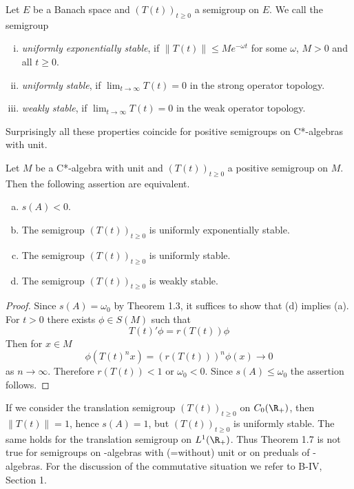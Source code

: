 \newpage

\begin{definition}\label{def:d4-1.6}
Let $E$ be a Banach space and $(T(t))_{t \geq 0}$ a semigroup on $E$.
We call the semigroup
\begin{enumerate}[(i)]
\item 
\emph{uniformly exponentially stable}, if $\|T(t)\| \leq Me^{-\omega t}$ for some $\omega$, $M > 0$ and all $t \geq 0$.

\item 
\emph{uniformly stable}, if $\lim_{t \to \infty} T(t) = 0$ in the strong operator topology.

\item 
\emph{weakly stable}, if $\lim_{t \to \infty} T(t) = 0$ in the weak operator topology.
\end{enumerate}
\end{definition}
Surprisingly all these properties coincide for positive semigroups on C*-algebras with unit.
\begin{theorem}\label{thm:d4-1.7}
Let $M$ be a C*-algebra with unit and $(T(t))_{t \geq 0}$ a positive semigroup on $M$.
Then the following assertion are equivalent.

\begin{enumerate}[(a)]
\item 
$s(A) < 0$.

\item 
The semigroup $(T(t))_{t \geq 0}$ is uniformly exponentially stable.

\item 
The semigroup $(T(t))_{t \geq 0}$ is uniformly stable.

\item 
The semigroup $(T(t))_{t \geq 0}$ is weakly stable.

\end{enumerate}
\end{theorem}
\begin{proof}
Since $s(A) = \omega_{0}$ by Theorem 1.3, it suffices to show that (d) implies (a).
For $t > 0$ there exists $\phi \in S(M)$ such that
\[
    T(t)'\phi = r(T(t))\phi
\]
Then for $x \in M$
\[
    \phi(T(t)^{n}x) = (r(T(t)))^{n} \phi(x) \to 0
\]
as $n \to \infty$.
Therefore $r(T(t)) < 1$ or $\omega_{0} < 0$.
Since $s(A) \leq \omega_{0}$ the assertion follows.
\end{proof}
\newpage

\begin{remark}\label{rem:d4-1.8}
If we consider the translation semigroup $(T(t))_{t \geq 0}$ on $C_{0}(\R_{+})$, then $\|T(t)\| = 1$, hence $s(A) = 1$, but $(T(t))_{t \geq 0}$ is uniformly stable.
The same holds for the translation semigroup on $L^1(\R_{+})$.
Thus Theorem 1.7 is not true for semigroups on \CA-algebras with (=without) unit or on preduals of \WA-algebras.
For the discussion of the commutative situation we refer to B-IV, Section 1.
\end{remark}

